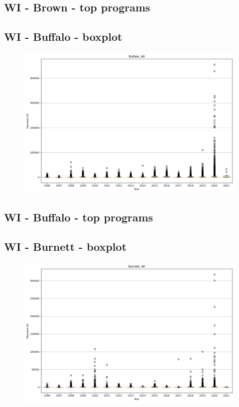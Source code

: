 \subsection*{WI - Brown - top programs}

\newpage
\subsection*{WI - Buffalo - boxplot}
\begin{figure}[h]
\centering
\includegraphics[width=7in]{../output/boxplots/counties/Buffalo-WI_boxplot.png}
\end{figure}


\subsection*{WI - Buffalo - top programs}

\newpage
\subsection*{WI - Burnett - boxplot}
\begin{figure}[h]
\centering
\includegraphics[width=7in]{../output/boxplots/counties/Burnett-WI_boxplot.png}
\end{figure}


